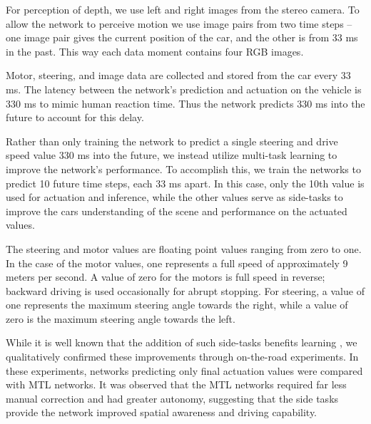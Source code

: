 For perception of depth, we use left and right images from the stereo camera. To allow the network to perceive motion we use image pairs from two time steps -- one image pair gives the current position of the car, and the other is from 33 ms in the past. This way each data moment contains four RGB images.

Motor, steering, and image data are collected and stored from the car every 33 ms.
The latency between the network's prediction and actuation on the vehicle is 330 ms to mimic human reaction time. Thus the network predicts 330 ms into the future to account for this delay.

Rather than only training the network to predict a single steering and drive speed value 330 ms into the future, we instead utilize multi-task learning to improve the network's performance. To accomplish this, we train the networks to predict 10 future time steps, each 33 ms apart. In this case, only the 10th value is used for actuation and inference, while the other values serve as side-tasks to improve the cars understanding of the scene and performance on the actuated values.

The steering and motor values are floating point values ranging from zero to one. In the case of the motor values, one represents a full speed of approximately 9 meters per second. A value of zero for the motors is full speed in reverse; backward driving is used occasionally for abrupt stopping. For steering, a value of one represents the maximum steering angle towards the right, while a value of zero is the maximum steering angle towards the left.

While it is well known that the addition of such side-tasks benefits learning \cite{caruana1998multitask}, we qualitatively confirmed these improvements through on-the-road experiments. In these experiments, networks predicting only final actuation values were compared with MTL networks. It was observed that the MTL networks required far less manual correction and had greater autonomy, suggesting that the side tasks provide the network improved spatial awareness and driving capability.
